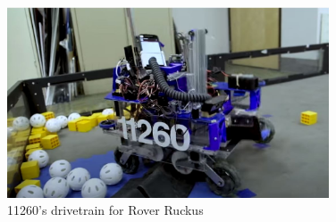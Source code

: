 \begin{figure}
\centering
\includegraphics[width=0.85\textwidth, angle=0]{Meetings/September/09-23-21/9-21-21_Hardware_Image1 - Nathan Forrer.JPG}
\caption{11260's drivetrain for Rover Ruckus}
\label{fig:pic4}
\end{figure}





